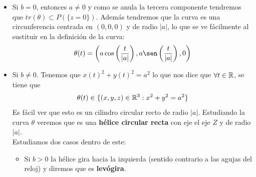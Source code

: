 \begin{ejemplo}
\begin{enumerate}
\begin{itemize}
            \item Si $b=0$, entonces $a\neq 0$ y como se anula la tercera componente tendremos que $tr(\theta)\subset P(\{z=0\})$. Además tendremos que la curva es una circunferencia centrada en $(0,0,0)$ y de radio $|a|$, lo que se ve fácilmente al sustituir en la definición de la curva:
            \begin{gather*}
                \theta(t) = \left(a\cos\left(\frac{t}{|a|}\right), a\sen\left(\frac{t}{|a|}\right), 0\right)
            \end{gather*}
            
            \item Si $b\neq 0$. Tenemos que $x(t)^2 + y(t)^2 = a^2$ lo que nos dice que $\forall t \in \mathbb{R}$, se tiene que
            \begin{gather*}
                \theta(t) \in \{(x,y,z)\in \mathbb{R}^3 : x^2 + y^2 = a^2\}
            \end{gather*}
            Es fácil ver que esto es un cilindro circular recto de radio $|a|$. Estudiando la curva $\theta$ veremos que es una \textbf{hélice circular recta} con eje el eje $Z$ y de radio $|a|$.\\

            Estudiamos dos casos dentro de este:
            \begin{itemize}
                \item Si $b>0$ la hélice gira hacia la izquierda (sentido contrario a las agujas del reloj) y diremos que es \textbf{levógira}.
                

\end{itemize}
\end{itemize}
\end{enumerate}
\end{ejemplo}
